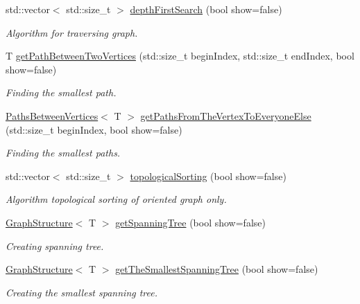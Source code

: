 \begin{DoxyCompactItemize}
std\+::vector$<$ std\+::size\+\_\+t $>$ \mbox{\hyperlink{classgs_1_1_graph_structure_a6a9516f3f46cbbcdc50741e342a22ae4}{depth\+First\+Search}} (bool show=false)
\begin{DoxyCompactList}\small\item\em Algorithm for traversing graph. \end{DoxyCompactList}\item 
T \mbox{\hyperlink{classgs_1_1_graph_structure_ac144d278d9b8a2d1bf0c4b59c0146348}{get\+Path\+Between\+Two\+Vertices}} (std\+::size\+\_\+t begin\+Index, std\+::size\+\_\+t end\+Index, bool show=false)
\begin{DoxyCompactList}\small\item\em Finding the smallest path. \end{DoxyCompactList}\item 
\mbox{\hyperlink{structpbv_1_1_paths_between_vertices}{Paths\+Between\+Vertices}}$<$ T $>$ \mbox{\hyperlink{classgs_1_1_graph_structure_a32134a6cd71384928dfd6e52794e12ff}{get\+Paths\+From\+The\+Vertex\+To\+Everyone\+Else}} (std\+::size\+\_\+t begin\+Index, bool show=false)
\begin{DoxyCompactList}\small\item\em Finding the smallest paths. \end{DoxyCompactList}\item 
std\+::vector$<$ std\+::size\+\_\+t $>$ \mbox{\hyperlink{classgs_1_1_graph_structure_aaaccde89d753affe1ca96ad3a25a03b0}{topological\+Sorting}} (bool show=false)
\begin{DoxyCompactList}\small\item\em Algorithm topological sorting of oriented graph only. \end{DoxyCompactList}\item 
\mbox{\hyperlink{classgs_1_1_graph_structure}{Graph\+Structure}}$<$ T $>$ \mbox{\hyperlink{classgs_1_1_graph_structure_adb32325d5e18eaf7bec12e6fc64e93c9}{get\+Spanning\+Tree}} (bool show=false)
\begin{DoxyCompactList}\small\item\em Creating spanning tree. \end{DoxyCompactList}\item 
\mbox{\hyperlink{classgs_1_1_graph_structure}{Graph\+Structure}}$<$ T $>$ \mbox{\hyperlink{classgs_1_1_graph_structure_a84565337bd8e3ca9a22512b3e7d0e4fb}{get\+The\+Smallest\+Spanning\+Tree}} (bool show=false)
\begin{DoxyCompactList}\small\item\em Creating the smallest spanning tree. \end{DoxyCompactList}\end{DoxyCompactItemize}


